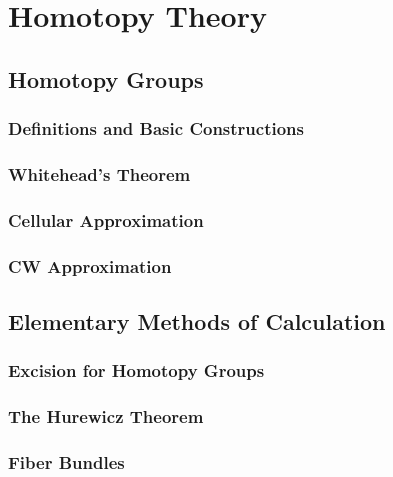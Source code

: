 \documentclass[11pt, a4paper]{article}
\begin{document}
\section{Homotopy Theory}

\subsection{Homotopy Groups}

\subsubsection{Definitions and Basic Constructions}

\subsubsection{Whitehead's Theorem}

\subsubsection{Cellular Approximation}

\subsubsection{CW Approximation}

\subsection{Elementary Methods of Calculation}

\subsubsection{Excision for Homotopy Groups}

\subsubsection{The Hurewicz Theorem}

\subsubsection{Fiber Bundles}
\end{document}
